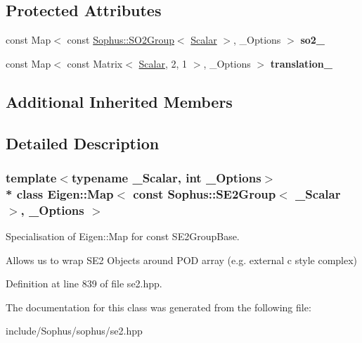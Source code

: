 \subsection*{Protected Attributes}
\begin{DoxyCompactItemize}
\item 
const Map$<$ const \hyperlink{class_sophus_1_1_s_o2_group}{Sophus\+::\+S\+O2\+Group}$<$ \hyperlink{class_eigen_1_1_map_3_01const_01_sophus_1_1_s_e2_group_3_01___scalar_01_4_00_01___options_01_4_a650e0e4b02a9d2374857c53ff39f5649}{Scalar} $>$, \+\_\+\+Options $>$ {\bfseries so2\+\_\+}\hypertarget{class_eigen_1_1_map_3_01const_01_sophus_1_1_s_e2_group_3_01___scalar_01_4_00_01___options_01_4_a3d635e50c759cabbed1ccb89e0a59b1d}{}\label{class_eigen_1_1_map_3_01const_01_sophus_1_1_s_e2_group_3_01___scalar_01_4_00_01___options_01_4_a3d635e50c759cabbed1ccb89e0a59b1d}

\item 
const Map$<$ const Matrix$<$ \hyperlink{class_eigen_1_1_map_3_01const_01_sophus_1_1_s_e2_group_3_01___scalar_01_4_00_01___options_01_4_a650e0e4b02a9d2374857c53ff39f5649}{Scalar}, 2, 1 $>$, \+\_\+\+Options $>$ {\bfseries translation\+\_\+}\hypertarget{class_eigen_1_1_map_3_01const_01_sophus_1_1_s_e2_group_3_01___scalar_01_4_00_01___options_01_4_ace013fbca399e772d6b6b58d0242bd8b}{}\label{class_eigen_1_1_map_3_01const_01_sophus_1_1_s_e2_group_3_01___scalar_01_4_00_01___options_01_4_ace013fbca399e772d6b6b58d0242bd8b}

\end{DoxyCompactItemize}
\subsection*{Additional Inherited Members}


\subsection{Detailed Description}
\subsubsection*{template$<$typename \+\_\+\+Scalar, int \+\_\+\+Options$>$\\*
class Eigen\+::\+Map$<$ const Sophus\+::\+S\+E2\+Group$<$ \+\_\+\+Scalar $>$, \+\_\+\+Options $>$}

Specialisation of Eigen\+::\+Map for const S\+E2\+Group\+Base. 

Allows us to wrap S\+E2 Objects around P\+OD array (e.\+g. external c style complex) 

Definition at line 839 of file se2.\+hpp.



The documentation for this class was generated from the following file\+:\begin{DoxyCompactItemize}
\item 
include/\+Sophus/sophus/se2.\+hpp\end{DoxyCompactItemize}
